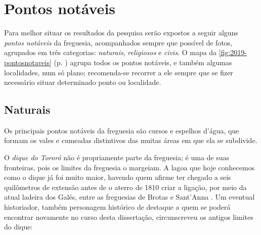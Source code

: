 \section{Pontos notáveis}\label{sec:pontnot}

Para melhor situar os resultados da pesquisa serão expostos a seguir alguns \textit{pontos notáveis} da freguesia, acompanhados sempre que possível de fotos, agrupados em três categorias: \textit{naturais}, \textit{religiosos} e \textit{civis}. O mapa da \autoref{fig:2019-pontosnotaveis} (p. \pageref{fig:2019-pontosnotaveis}) agrupa todos os pontos notáveis, e também algumas localidades, num só plano; recomenda-se recorrer a ele sempre que se fizer necessário situar determinado ponto ou localidade.

\subsection{Naturais}\label{subsec:pontnat}

Os principais pontos notáveis da freguesia são cursos e espelhos d'água, que formam os vales e cumeadas distintivos das muitas áreas em que ela se subdivide.

O \textit{dique do Tororó} não é propriamente parte da freguesia; é uma de suas fronteiras, pois os limites da freguesia o margeiam. A lagoa que hoje conhecemos como o dique já foi muito maior, havendo quem afirme ter chegado a seis quilômetros de extensão antes de o aterro de 1810 criar a ligação, por meio da atual ladeira dos Galés, entre as freguesias de Brotas e Sant'Anna \cite[p.~48]{santos_aguas_2010}. Um eventual historiador, também personagem histórico de destaque a quem se poderá encontrar novamente no curso desta dissertação, circunscreveu os antigos limites do dique:

